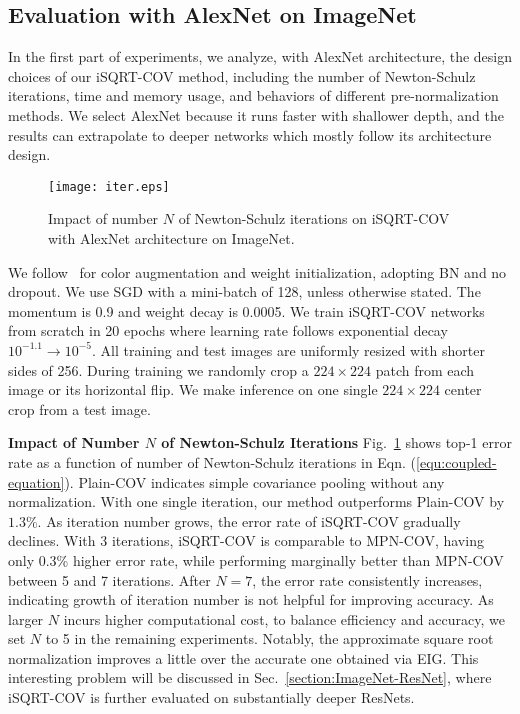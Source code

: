 \documentclass[10pt,twocolumn,letterpaper]{article}
\begin{document}
\subsection{Evaluation with AlexNet on ImageNet}\label{section:ImageNet-AlexNet}

In the first part of experiments, we analyze, with AlexNet architecture, the design choices of our iSQRT-COV method, including the number of Newton-Schulz iterations,  time and memory usage, and behaviors of different pre-normalization methods.  We select AlexNet because it runs faster with shallower depth, and the results can  extrapolate to deeper networks  which mostly follow its architecture design. 


\begin{figure}
\centering
\begin{minipage}[b]{0.65\linewidth}
\centering
\texttt{[image: iter.eps]}
\end{minipage}
\caption{Impact of  number $N$ of Newton-Schulz iterations on iSQRT-COV with AlexNet architecture on ImageNet.}
\label{fig:impact_iteration-N}
\end{figure}

We follow~\cite{Li_2017_ICCV} for color augmentation and weight initialization, adopting BN and no dropout. We use SGD with  a mini-batch of 128,  unless otherwise stated. The momentum is  0.9 and  weight decay is 0.0005. We train iSQRT-COV networks from scratch in 20 epochs where  learning rate follows exponential decay  $10^{-1.1} \to 10^{-5}$. All training and test images are uniformly resized with shorter sides of 256. During training we randomly crop a $224\times224$ patch from each image or its horizontal flip. We make inference on one single  $224\times 224$ center crop from a test image. 

\vspace{4pt}\noindent\textbf{Impact of  Number $N$ of Newton-Schulz Iterations}\quad 
Fig.~\ref{fig:impact_iteration-N} shows top-1 error rate as a function of  number  of Newton-Schulz iterations in Eqn.  (\ref{equ:coupled-equation}). Plain-COV indicates simple covariance pooling without any normalization. With one single iteration, our method outperforms Plain-COV by $1.3\%$. As iteration number grows, the error rate of iSQRT-COV gradually declines. With 3 iterations, iSQRT-COV is comparable to MPN-COV, having only 0.3\% higher error rate, while performing marginally better than MPN-COV between 5 and 7 iterations. After $N=7$, the error rate consistently increases, indicating growth of iteration number is not helpful for improving accuracy. As larger $N$ incurs higher computational cost, to balance efficiency and accuracy, we set $N$ to 5  in the remaining experiments. Notably, the approximate square root normalization improves a little over the accurate one obtained via EIG. This interesting problem will be discussed in  Sec.~\ref{section:ImageNet-ResNet}, where iSQRT-COV is further evaluated on substantially deeper ResNets.
\end{document}
